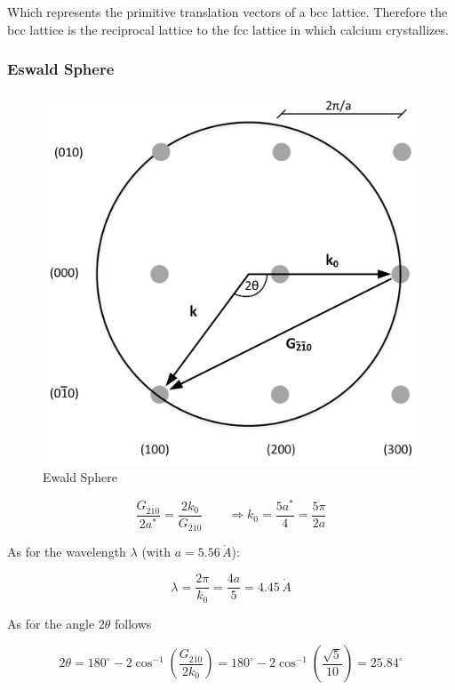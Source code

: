 Which represents the primitive translation vectors of a bcc lattice.
Therefore the bcc lattice is the reciprocal lattice to the fcc lattice
in which calcium crystallizes.


\subsubsection*{Eswald Sphere}

\begin{figure}[H]
	\centering
	\includegraphics[width=0.7\linewidth]{Graphics/Chapter2/ewald_sphere.png}
	\caption{Ewald Sphere}
	\label{fig:ewals_sphere}
\end{figure}

$$\frac{G_{\overline{2}\overline{1}0}}{2a^*} = \frac{2 k_0}{G_{\overline{2}\overline{1}0}} \qquad \Rightarrow k_0 = \frac{5a^*}{4} = \frac{5\pi}{2a}$$

As for the wavelength $\lambda$  (with $a = 5.56 \, \mathring{A}$):

$$\lambda = \frac{2\pi}{k_0} = \frac{4a}{5} = 4.45  \, \mathring{A}$$

As for the angle $2\theta$ follows

$$2\theta = 180^\circ - 2 \cos^{-1} \left( \frac{G_{\overline{2}\overline{1}0}}{2k_0} \right) =
    180^\circ - 2 \cos^{-1} \left( \frac{\sqrt{5}}{10} \right) = 25.84 ^\circ$$